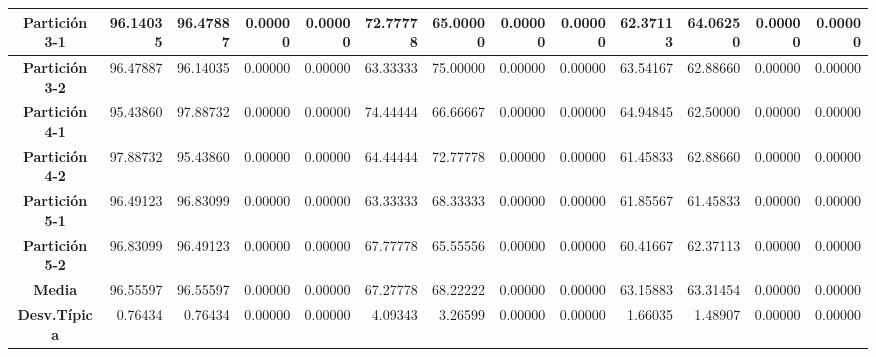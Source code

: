 \documentclass[a4paper,11pt]{article}
\begin{document}
\begin{table}[H]
\begin{adjustbox}{width=1.1\textwidth}
\begin{tabular}{|c|r|r|r|r|r|r|r|r|r|r|r|r|}
  \textbf{Partición 3-1} & 96.14035 & 96.47887 & 0.00000 & 0.00000 & 72.77778 & 65.00000 & 0.00000 & 0.00000 & 62.37113 & 64.06250 & 0.00000 & 0.00000 \\ \hline
  \textbf{Partición 3-2} & 96.47887 & 96.14035 & 0.00000 & 0.00000 & 63.33333 & 75.00000 & 0.00000 & 0.00000 & 63.54167 & 62.88660 & 0.00000 & 0.00000 \\ \hline
  \textbf{Partición 4-1} & 95.43860 & 97.88732 & 0.00000 & 0.00000 & 74.44444 & 66.66667 & 0.00000 & 0.00000 & 64.94845 & 62.50000 & 0.00000 & 0.00000 \\ \hline
  \textbf{Partición 4-2} & 97.88732 & 95.43860 & 0.00000 & 0.00000 & 64.44444 & 72.77778 & 0.00000 & 0.00000 & 61.45833 & 62.88660 & 0.00000 & 0.00000 \\ \hline
  \textbf{Partición 5-1} & 96.49123 & 96.83099 & 0.00000 & 0.00000 & 63.33333 & 68.33333 & 0.00000 & 0.00000 & 61.85567 & 61.45833 & 0.00000 & 0.00000 \\ \hline
  \textbf{Partición 5-2} & 96.83099 & 96.49123 & 0.00000 & 0.00000 & 67.77778 & 65.55556 & 0.00000 & 0.00000 & 60.41667 & 62.37113 & 0.00000 & 0.00000 \\ \hline
  \textbf{Media} & 96.55597 & 96.55597 & 0.00000 & 0.00000 & 67.27778 & 68.22222 & 0.00000 & 0.00000 & 63.15883 & 63.31454 & 0.00000 & 0.00000 \\ \hline
  \textbf{Desv.Típica} & 0.76434 & 0.76434 & 0.00000 & 0.00000 & 4.09343 & 3.26599 & 0.00000 & 0.00000 & 1.66035 & 1.48907 & 0.00000 & 0.00000 \\ \hline
  \end{tabular}
  \end{adjustbox}
  \label{NN3}
  \end{table}
  
\end{document}
